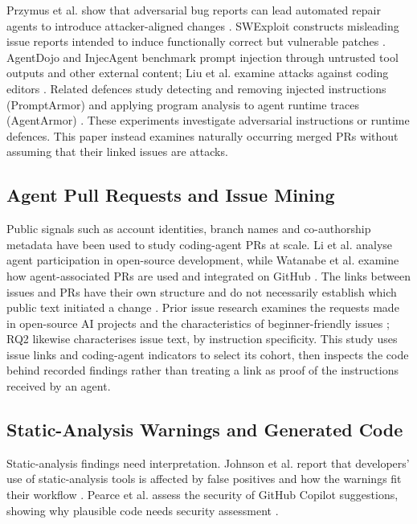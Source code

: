 \documentclass[acmsmall,screen,nonacm,review]{acmart}
\begin{document}
Przymus et al. show that adversarial bug reports can lead automated repair agents to introduce attacker-aligned changes \cite{b16}. SWExploit constructs misleading issue reports intended to induce functionally correct but vulnerable patches \cite{b3}. AgentDojo and InjecAgent benchmark prompt injection through untrusted tool outputs and other external content; Liu et al. examine attacks against coding editors \cite{b6,b24,b12}. Related defences study detecting and removing injected instructions (PromptArmor) and applying program analysis to agent runtime traces (AgentArmor) \cite{b45,b46}. These experiments investigate adversarial instructions or runtime defences. This paper instead examines naturally occurring merged PRs without assuming that their linked issues are attacks.

\subsection{Agent Pull Requests and Issue Mining}

Public signals such as account identities, branch names and co-authorship metadata have been used to study coding-agent PRs at scale. Li et al. analyse agent participation in open-source development, while Watanabe et al. examine how agent-associated PRs are used and integrated on GitHub \cite{b11,b21}. The links between issues and PRs have their own structure and do not necessarily establish which public text initiated a change \cite{b5}. Prior issue research examines the requests made in open-source AI projects and the characteristics of beginner-friendly issues \cite{b23,b26}; RQ2 likewise characterises issue text, by instruction specificity. This study uses issue links and coding-agent indicators to select its cohort, then inspects the code behind recorded findings rather than treating a link as proof of the instructions received by an agent.

\subsection{Static-Analysis Warnings and Generated Code}

Static-analysis findings need interpretation. Johnson et al. report that developers' use of static-analysis tools is affected by false positives and how the warnings fit their workflow \cite{b33}. Pearce et al. assess the security of GitHub Copilot suggestions, showing why plausible code needs security assessment \cite{b35}.
\end{document}
